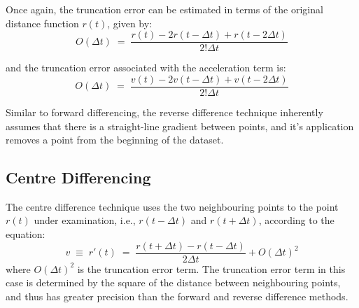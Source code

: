 \documentclass[namedreferences]{SolarPhysics}
\begin{document}
\begin{article}
Once again, the truncation error can be estimated in terms of the original distance function $r(t)$, given by:
\begin{equation}
O(\Delta t) \; = \; \frac{r(t) - 2r(t - \Delta t) + r(t - 2\Delta t)}{2!\Delta t}
\end{equation}

and the truncation error associated with the acceleration term is:
\begin{equation}
O(\Delta t) \; = \; \frac{v(t) - 2v(t - \Delta t) + v(t - 2\Delta t)}{2!\Delta t}
\end{equation}

Similar to forward differencing, the reverse difference technique inherently assumes that there is a straight-line gradient between points, and it's application removes a point from the beginning of the dataset.



\subsection{Centre Differencing}
\label{sect_centre}

The centre difference technique uses the two neighbouring points to the point $r(t)$ under examination, i.e., $r(t - \Delta t)$ and $r(t + \Delta t)$, according to the equation:
\begin{equation}
v \; \equiv \; r'(t) \; = \; \frac{r(t + \Delta t) - r(t - \Delta t)}{2 \Delta t} + O(\Delta t)^{2}
\end{equation}
where $O(\Delta t)^{2}$ is the truncation error term. The truncation error term in this case is determined by the square of the distance between neighbouring points, and thus has greater precision than the forward and reverse difference methods. 



\end{article}
\end{document}
